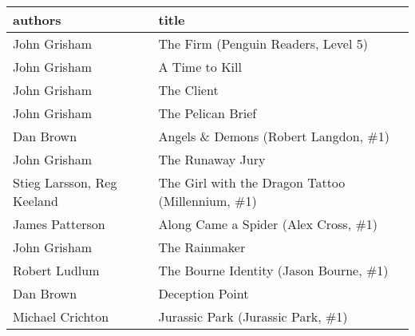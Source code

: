 \begin{tabular}{ll}
\toprule
                    authors &                                             title \\
\midrule
               John Grisham &               The Firm (Penguin Readers, Level 5) \\
               John Grisham &                                    A Time to Kill \\
               John Grisham &                                        The Client \\
               John Grisham &                                 The Pelican Brief \\
                  Dan Brown &             Angels \& Demons  (Robert Langdon, \#1) \\
               John Grisham &                                  The Runaway Jury \\
 Stieg Larsson, Reg Keeland &  The Girl with the Dragon Tattoo (Millennium, \#1) \\
            James Patterson &              Along Came a Spider (Alex Cross, \#1) \\
               John Grisham &                                     The Rainmaker \\
              Robert Ludlum &            The Bourne Identity (Jason Bourne, \#1) \\
                  Dan Brown &                                   Deception Point \\
           Michael Crichton &                 Jurassic Park (Jurassic Park, \#1) \\
\bottomrule
\end{tabular}
